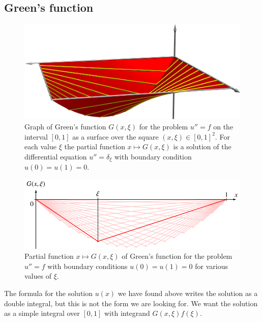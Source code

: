 \subsection{Green's function}
\begin{figure}
\begin{center}
\includegraphics[width=\hsize]{../common/3d/green.jpg}
\end{center}
\caption{Graph of Green's function $G(x,\xi)$ for the problem $u''=f$ 
on the interval $[0,1]$ as a surface over the square $(x,\xi)\in[0,1]^2$.
For each value $\xi$ the partial function
$x\mapsto G(x,\xi)$ is a solution of the differential equation
$u''=\delta_\xi$ with boundary condition $u(0)=u(1)=0$.
\label{elliptisch:green3dflaeche}}
\end{figure}
\begin{figure}
\begin{center}
\includegraphics{7-elliptic/images/green.pdf}
\end{center}
\caption{Partial function $x\mapsto G(x,\xi)$ of Green's function
for the problem $u''=f$ with boundary conditions 
$u(0)=u(1)=0$ for various values of $\xi$.
\label{elliptisch:green1schar}}
\end{figure}

The formula for the solution $u(x)$ we have found above writes the solution
as a double integral, but this is not the form we are looking for.
We want the solution as a simple integral over $[0,1]$ with integrand
$G(x,\xi) f(\xi)$.


